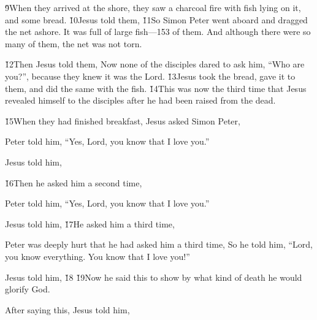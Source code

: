 \v{9}When they arrived at the shore, they saw a charcoal fire with fish lying on it, and some bread. \v{10}Jesus told them,  \v{11}So Simon Peter went aboard and dragged the net ashore. It was full of large fish---153 of them. And although there were so many of them, the net was not torn.

\v{12}Then Jesus told them,  Now none of the disciples dared to ask him, ``Who are you?'', because they knew it was the Lord. \v{13}Jesus took the bread, gave it to them, and did the same with the fish. \v{14}This was now the third time that Jesus revealed himself to the disciples after he had been raised from the dead.

\v{15}When they had finished breakfast, Jesus asked Simon Peter, 

Peter told him, ``Yes, Lord, you know that I love you.''

Jesus told him, 

\v{16}Then he asked him a second time, 

Peter told him, ``Yes, Lord, you know that I love you.''

Jesus told him,  \v{17}He asked him a third time, 

Peter was deeply hurt that he had asked him a third time,  So he told him, ``Lord, you know everything. You know that I love you!''

Jesus told him,  \v{18} \v{19}Now he said this to show by what kind of death he would glorify God.

After saying this, Jesus told him, 

